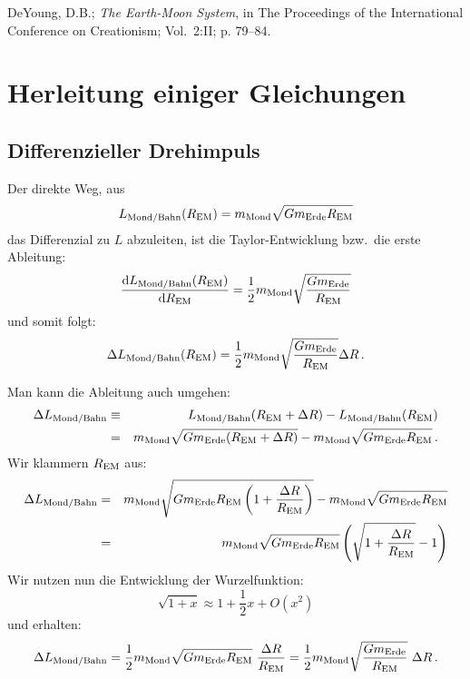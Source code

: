 \begin{thebibliography}{9}
 DeYoung, D.B.; \textit{The Earth-Moon System}, in The Proceedings of the
          International Conference on Creationism; Vol.\ 2:II; p. 79--84.  
\end{thebibliography}

\section{Herleitung einiger Gleichungen}

\subsection{Differenzieller Drehimpuls}
\label{secB}

Der direkte Weg, aus 
\begin{equation}
        L_{\rm Mond/Bahn}(R_{\rm EM}) = m_{\rm Mond} \sqrt{G m_{\rm Erde} R_{\rm EM}} 
\end{equation}
das Differenzial zu $L$ abzuleiten, ist die Taylor-Entwicklung bzw.\ die erste Ableitung:
\begin{equation}
       \frac{{\rm d} L_{\rm Mond/Bahn}(R_{\rm EM})}{{\rm d}R_{\rm EM}} = 
          \frac{1}{2} m_{\rm Mond} \sqrt{\frac{G m_{\rm Erde}}{R_{\rm EM}}} 
\end{equation}
und somit folgt:
\begin{equation}
       \Delta  L_{\rm Mond/Bahn}(R_{\rm EM}) = 
          \frac{1}{2} m_{\rm Mond} \sqrt{\frac{G m_{\rm Erde}}{R_{\rm EM}}} \Delta R \, .
\end{equation}

Man kann die Ableitung auch umgehen:
\begin{eqnarray}
        \Delta L_{\rm Mond/Bahn} & \equiv &   L_{\rm Mond/Bahn}(R_{\rm EM}+\Delta R) -  L_{\rm Mond/Bahn}(R_{\rm EM}) \\
        &=& m_{\rm Mond} \sqrt{G m_{\rm Erde} ( R_{\rm EM} + \Delta R)} - m_{\rm Mond} \sqrt{G m_{\rm Erde} R_{\rm EM}}
          \, .
\end{eqnarray}
Wir klammern $R_{\rm EM}$ aus:
\begin{eqnarray}
        \Delta L_{\rm Mond/Bahn}
        &=&  m_{\rm Mond} \sqrt{G m_{\rm Erde} R_{\rm EM} \left( 1 + \frac{\Delta R}{R_{\rm EM}}\right) }  
                   - m_{\rm Mond} \sqrt{G m_{\rm Erde} R_{\rm EM}}  \\
      &=& m_{\rm Mond} \sqrt{G m_{\rm Erde} R_{\rm EM}} \left( \sqrt{1 + \frac{\Delta R}{R_{\rm EM}} } - 1 \right)               
\end{eqnarray}
Wir nutzen nun die Entwicklung der Wurzelfunktion:
\begin{equation}
        \sqrt{1+ x} \approx 1 + \frac{1}{2} x + O(x^2)  
\end{equation}
und erhalten:
\begin{equation}
        \Delta L_{\rm Mond/Bahn}
        =\frac{1}{2} m_{\rm Mond} \sqrt{G m_{\rm Erde} R_{\rm EM}} ~   \frac{\Delta R}{R_{\rm EM}} 
        =\frac{1}{2} m_{\rm Mond} \sqrt{\frac{G m_{\rm Erde}}{R_{\rm EM}}} ~   \Delta R \, .
\end{equation}

%
